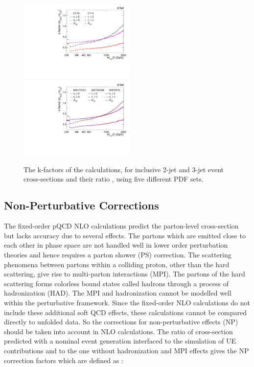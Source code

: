 \begin{figure}[!htbp]
 \begin{center}
 \hspace*{-5mm}\includegraphics[width=0.51\textwidth]{Plots_HT_2_150/Kfactor_all_1.pdf}%
 ~~\includegraphics[width=0.51\textwidth]{Plots_HT_2_150/Kfactor_all_2.pdf}
 \caption[]{The k-factors of the \NLOJETPP calculations, for inclusive 2-jet and 3-jet event cross-sections and their ratio \ratio, using five different PDF sets.}
 \label{fig:kfactor}
 \end{center}
\end{figure}

\subsection{Non-Perturbative Corrections}
\label{sec:NPcorr}

The fixed-order pQCD NLO calculations predict the parton-level cross-section but lacks accuracy due to several effects. The partons which are emitted close to each other in phase space are not handled well in lower order perturbation theories and hence requires a parton shower (PS) correction. The scattering phenomena between partons within a colliding proton, other than the hard scattering, give rise to multi-parton interactions (MPI). The partons of the hard scattering forms colorless bound states called hadrons through a process of hadronization (HAD). The MPI and hadronization cannot be modelled well within the perturbative framework. Since the fixed-order NLO calculations do not include these additional soft QCD effects, these calculations cannot be compared directly to unfolded data. So the corrections for non-perturbative effects (NP) should be taken into account in NLO calculations. The ratio of cross-section predicted with a nominal event generation interfaced to the simulation of UE contributions and to the one without hadronization and MPI effects gives the NP correction factors which are defined as : 

